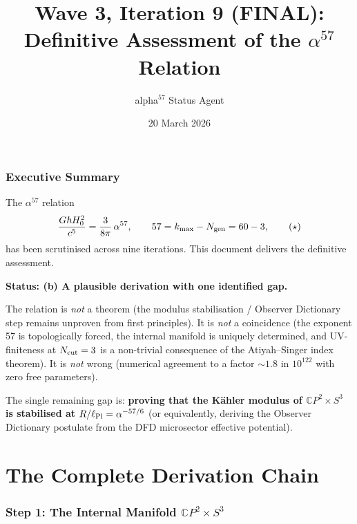 \documentclass[11pt,a4paper]{article}
\title{Wave 3, Iteration 9 (FINAL):\\
\Large Definitive Assessment of the $\alpha^{57}$ Relation}
\author{alpha$^{57}$ Status Agent}
\date{20 March 2026}
\newcommand{\CP}{\mathbb{C}P}
\newcommand{\Hzero}{H_0}
\newcommand{\alphafine}{\alpha}
\begin{document}
\maketitle

\section*{Executive Summary}

The $\alpha^{57}$ relation
\begin{equation}
\frac{G\hbar \Hzero^2}{c^5} = \frac{3}{8\pi}\,\alphafine^{57},
\qquad 57 = k_{\max} - N_{\rm gen} = 60 - 3,
\tag{$\star$}
\end{equation}
has been scrutinised across nine iterations. This document delivers
the definitive assessment.

\begin{tcolorbox}[colback=blue!5!white, colframe=blue!60!black,
  title=\textbf{FINAL VERDICT}]
\textbf{Status: (b) A plausible derivation with one identified gap.}

The relation is \emph{not} a theorem (the modulus stabilisation / Observer
Dictionary step remains unproven from first principles). It is \emph{not}
a coincidence (the exponent 57 is topologically forced, the internal
manifold is uniquely determined, and UV-finiteness at $N_{\rm cut} = 3$
is a non-trivial consequence of the Atiyah--Singer index theorem).
It is \emph{not} wrong (numerical agreement to a factor $\sim 1.8$ in
$10^{122}$ with zero free parameters).

The single remaining gap is: \textbf{proving that the K\"ahler modulus
of $\CP^2 \times S^3$ is stabilised at
$R/\ell_{\rm Pl} = \alphafine^{-57/6}$} (or equivalently, deriving the
Observer Dictionary postulate from the DFD microsector effective
potential).
\end{tcolorbox}

\part{The Complete Derivation Chain}
\label{part:chain}

\section{Step 1: The Internal Manifold $\CP^2 \times S^3$}
\label{sec:step1}
\end{document}

